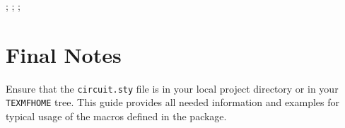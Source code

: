 \documentclass[a4paper,12pt]{article}
\begin{document}
\begin{center}
   
    \begin{circuitikz}[]%
    
    
        ;
        ;
        ;
        
    
    
    \end{circuitikz}
\end{center}

\section{Final Notes}

Ensure that the \texttt{circuit.sty} file is in your local project directory or in your \texttt{TEXMFHOME} tree. This guide provides all needed information and examples for typical usage of the macros defined in the package.
\end{document}
